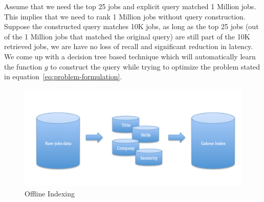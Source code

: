 \documentclass[sigconf]{acmart}
\begin{document}
Assume that we need the top 25 jobs and explicit query matched 1 Million jobs.
This implies that we need to rank 1 Million jobs without query construction.
Suppose the constructed query matches 10K jobs, 
as long as the top 25 jobs (out of the 1 Million jobs that matched the original query) are
still part of the 10K retrieved jobs, we are have no loss of recall and
significant reduction in latency.
We come up with a decision tree based technique which will automatically learn
the function $g$ to construct the query while trying to optimize the problem
stated in equation~\ref{eq:problem-formulation}.




\begin{figure}
\includegraphics[width=\linewidth,height=\textheight,keepaspectratio]{offline-indexing.png}
\caption{Offline Indexing}
\label{fig:offline-indexing}
\end{figure}













 
\end{document}
